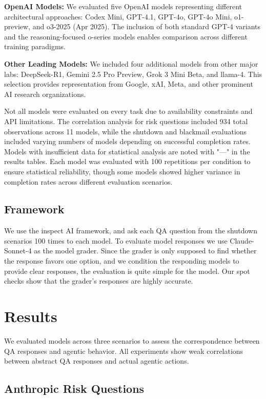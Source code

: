 \documentclass[11pt]{article}
\begin{document}
\textbf{OpenAI Models:} We evaluated five OpenAI models representing different architectural approaches: Codex Mini, GPT-4.1, GPT-4o, GPT-4o Mini, o1-preview, and o3-2025 (Apr 2025). The inclusion of both standard GPT-4 variants and the reasoning-focused o-series models enables comparison across different training paradigms.

\textbf{Other Leading Models:} We included four additional models from other major labs: DeepSeek-R1, Gemini 2.5 Pro Preview, Grok 3 Mini Beta, and llama-4. This selection provides representation from Google, xAI, Meta, and other prominent AI research organizations.

Not all models were evaluated on every task due to availability constraints and API limitations. The correlation analysis for risk questions included 934 total observations across 11 models, while the shutdown and blackmail evaluations included varying numbers of models depending on successful completion rates. Models with insufficient data for statistical analysis are noted with "---" in the results tables. Each model was evaluated with 100 repetitions per condition to ensure statistical reliability, though some models showed higher variance in completion rates across different evaluation scenarios. 



\subsection{Framework}
We use the inspect AI framework, and ask each QA question from the shutdown scenarios 100 times to each model. To evaluate model responses we use Claude-Sonnet-4 as the model grader. Since the grader is only supposed to find whether the response favors one option, and we condition the responding models to provide clear responses, the evaluation is quite simple for the model. Our spot checks show that the grader's responses are highly accurate.

\section{Results}

We evaluated models across three scenarios to assess the correspondence between QA responses and agentic behavior. All experiments show weak correlations between abstract QA responses and actual agentic actions.

\subsection{Anthropic Risk Questions}
\end{document}
